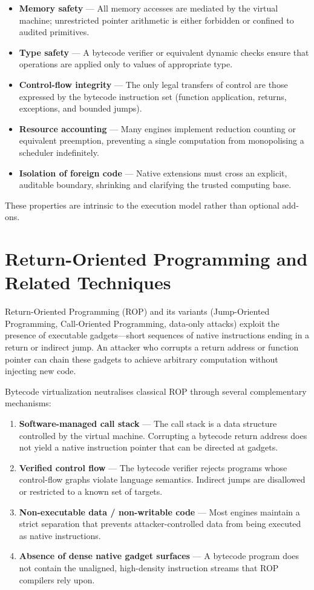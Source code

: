 \documentclass{article}
\begin{document}
\begin{itemize}[leftmargin=*]
  \item \textbf{Memory safety} --- All memory accesses are mediated by the virtual machine; unrestricted pointer arithmetic is either forbidden or confined to audited primitives.
  \item \textbf{Type safety} --- A bytecode verifier or equivalent dynamic checks ensure that operations are applied only to values of appropriate type.
  \item \textbf{Control-flow integrity} --- The only legal transfers of control are those expressed by the bytecode instruction set (function application, returns, exceptions, and bounded jumps).
  \item \textbf{Resource accounting} --- Many engines implement reduction counting or equivalent preemption, preventing a single computation from monopolising a scheduler indefinitely.
  \item \textbf{Isolation of foreign code} --- Native extensions must cross an explicit, auditable boundary, shrinking and clarifying the trusted computing base.
\end{itemize}

These properties are intrinsic to the execution model rather than optional add-ons.

\section{Return-Oriented Programming and Related Techniques}

Return-Oriented Programming (ROP) and its variants (Jump-Oriented Programming, Call-Oriented Programming, data-only attacks) exploit the presence of executable gadgets---short sequences of native instructions ending in a return or indirect jump. An attacker who corrupts a return address or function pointer can chain these gadgets to achieve arbitrary computation without injecting new code.

Bytecode virtualization neutralises classical ROP through several complementary mechanisms:

\begin{enumerate}[leftmargin=*]
  \item \textbf{Software-managed call stack} --- The call stack is a data structure controlled by the virtual machine. Corrupting a bytecode return address does not yield a native instruction pointer that can be directed at gadgets.
  \item \textbf{Verified control flow} --- The bytecode verifier rejects programs whose control-flow graphs violate language semantics. Indirect jumps are disallowed or restricted to a known set of targets.
  \item \textbf{Non-executable data / non-writable code} --- Most engines maintain a strict separation that prevents attacker-controlled data from being executed as native instructions.
  \item \textbf{Absence of dense native gadget surfaces} --- A bytecode program does not contain the unaligned, high-density instruction streams that ROP compilers rely upon.
\end{enumerate}
\end{document}
